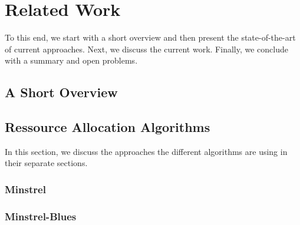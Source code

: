 \chapter{Related Work}
\label{chap:related_work}

%
To this end, we start with a short overview and then present the state-of-the-art of current approaches. Next, we discuss the current work.
%
Finally, we conclude with a summary and open problems.


\section{A Short Overview}
\label{s:basics}



\section{Ressource Allocation Algorithms}
\label{s:algorithms}
%
In this section, we discuss the approaches the different algorithms are using in their separate sections.
%

\subsection{Minstrel}
\label{ss:minstrel}



\subsection{Minstrel-Blues}
\label{ss:minstrel-b}
%


